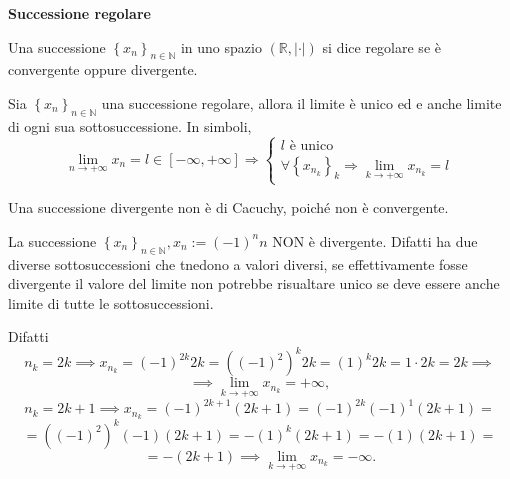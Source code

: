\begin{definition}
    \textbf{Successione regolare}

    Una successione $\left\{x_n\right\}_{n\in\mathbb{N}}$ in uno spazio
    $\left(\mathbb{R}, \left|\cdot\right|\right)$ si dice regolare se è convergente
    oppure divergente.
\end{definition}

\begin{proposition}
    Sia $\left\{x_n\right\}_{n\in\mathbb{N}}$ una successione regolare,
    allora il limite è unico ed e anche limite di ogni sua
    sottosuccessione. In simboli,
    \[
        \underset{n\rightarrow+\infty}{\lim} x_n = l\in\left[-\infty,+\infty\right]
        \Rightarrow \begin{cases}
            l \text{ è unico}\\
            \forall \left\{x_{n_k}\right\}_k \Rightarrow \underset{k\rightarrow+\infty}{\lim}x_{n_k} = l
        \end{cases}
    \]
\end{proposition}

\begin{observation}
    Una successione divergente non è di Cacuchy, poiché non è convergente.
\end{observation}

\begin{observation}
    La successione $\left\{x_n\right\}_{n\in\mathbb{N}}, x_n := \left(-1\right)^n n$ NON è
    divergente. Difatti ha due diverse sottosuccessioni che tnedono a valori diversi,
    se effettivamente fosse divergente il valore del limite non potrebbe risualtare unico
    se deve essere anche limite di tutte le sottosuccessioni.

    Difatti
    \[
        n_k = 2k  \implies x_{n_k} = \left(-1\right)^{2k} 2k = \left(\left(-1\right)^2\right)^k 2k =
        \left(1\right) ^ k 2k = 1 \cdot 2k = 2k \implies\]\[
        \implies \underset{k\rightarrow+\infty}{\lim} x_{n_k} = +\infty,
    \]\[
        n_k = 2k+1  \implies x_{n_k} = \left(-1\right)^{2k+1} \left(2k+1\right) =
        \left(-1\right)^{2k} \left(-1\right)^{1} \left(2k+1\right) = \]\[
        = \left(\left(-1\right)^2\right)^k \left(-1\right) \left(2k+1\right) =
        - \left(1\right) ^ k \left(2k+1\right) =
        - \left(1\right) \left(2k+1\right) = \]\[
        = -\left(2k+1\right) \implies \underset{k\rightarrow+\infty}{\lim} x_{n_k} = -\infty.
    \]
\end{observation}